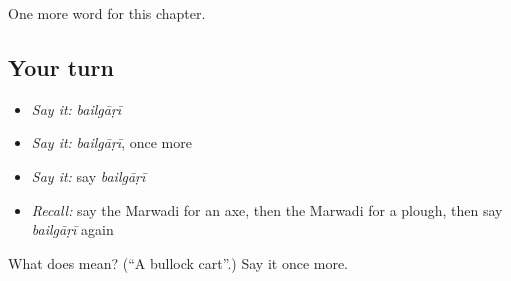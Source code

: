 \begin{grammarlens}[title={What you've built}]
One more word for this chapter.
\end{grammarlens}

\subsection*{Your turn}
\begin{itemize}
\raggedright
  \item \emph{Say it:} \emph{bailgāṛī}
  \item \emph{Say it:} \emph{bailgāṛī}, once more
  \item \emph{Say it:} say \emph{bailgāṛī}
  \item \emph{Recall:} say the Marwadi for an axe, then the Marwadi for a plough, then say \emph{bailgāṛī} again
\end{itemize}

\begin{tcolorbox}[breakable,colback=teal!4,colframe=teal!35!black,title={Before you move on}]
What does  mean? (\textquotedblleft{}A bullock cart\textquotedblright{}.) Say it once more.
\end{tcolorbox}
